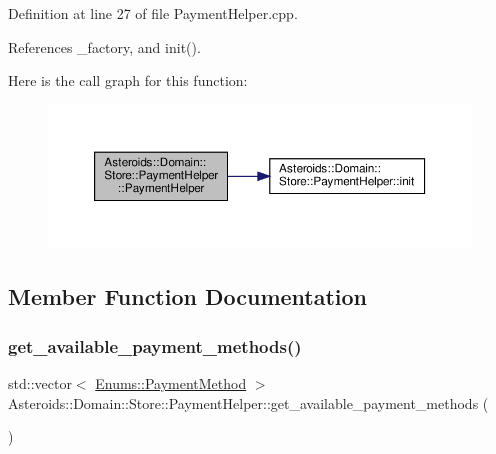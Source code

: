 Definition at line 27 of file Payment\+Helper.\+cpp.



References \+\_\+factory, and init().

Here is the call graph for this function\+:\nopagebreak
\begin{figure}[H]
\begin{center}
\leavevmode
\includegraphics[width=350pt]{classAsteroids_1_1Domain_1_1Store_1_1PaymentHelper_a76969f028c9cbad646a492bb38e945b5_cgraph}
\end{center}
\end{figure}


\subsection{Member Function Documentation}
\mbox{\label{classAsteroids_1_1Domain_1_1Store_1_1PaymentHelper_a97fdef985d90e7ed6170c9f414102ee1}} 
\subsubsection{\texorpdfstring{get\+\_\+available\+\_\+payment\+\_\+methods()}{get\_available\_payment\_methods()}}
{\footnotesize\ttfamily std\+::vector$<$ \hyperlink{namespaceAsteroids_1_1Domain_1_1Store_1_1Enums_a0a0c269f6834cb8b1b6ed3bb02983564}{Enums\+::\+Payment\+Method} $>$ Asteroids\+::\+Domain\+::\+Store\+::\+Payment\+Helper\+::get\+\_\+available\+\_\+payment\+\_\+methods (\begin{DoxyParamCaption}{ }\end{DoxyParamCaption})\hspace{0.3cm}{\ttfamily [virtual]}}



